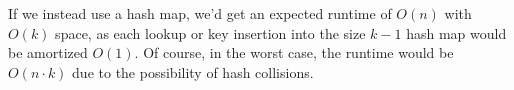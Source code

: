 \documentclass[12pt]{article}
\begin{document}
\begin{enumerate}
    If we instead use a hash map, we'd get an expected runtime of $O(n)$ with $O(k)$ space, as each lookup or key 
    insertion into the size $k - 1$ hash map would be amortized $O(1)$. Of course, in the worst case, the runtime would 
    be $O(n \cdot k)$ due to the possibility of hash collisions.
\end{enumerate}
\end{document}
